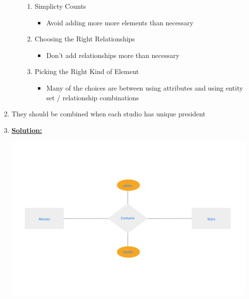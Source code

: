 \documentclass[12pt]{article}
\begin{document}
\begin{enumerate}[1.]
\begin{itemize}
\begin{enumerate}[1.]
            \item Simplicty Counts

            \begin{itemize}
                \item Avoid adding more more elements than necessary
            \end{itemize}
            \item Choosing the Right Relationships

            \begin{itemize}
                \item Don't add relationships more than necessary
            \end{itemize}

            \item Picking the Right Kind of Element

            \begin{itemize}
                \item Many of the choices are between using attributes and using
                entity set / relationship combinations
            \end{itemize}
        \end{enumerate}
    \end{itemize}

    \item

    They should be combined when each studio has unique president

    \item

    \underline{\textbf{Solution:}}

    \bigskip

    \begin{center}
    \includegraphics[width=\linewidth]{images/worksheet_14_solution_39.png}
    \end{center}


\end{enumerate}
\end{document}
